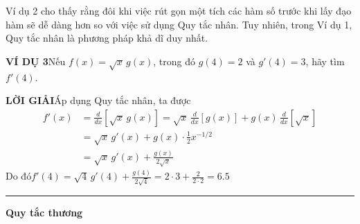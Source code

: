 \noindent
\begin{minipage}[t]{0.24\textwidth}
    \mbox{}
\end{minipage}%
\hfill
\begin{minipage}[t]{0.73\textwidth}
    \fontsize{10}{14}\selectfont
    Ví dụ 2 cho thấy rằng đôi khi việc rút gọn một tích các hàm số trước khi lấy đạo hàm sẽ dễ dàng hơn so với việc sử dụng Quy tắc nhân. Tuy nhiên, trong Ví dụ 1, Quy tắc nhân là phương pháp khả dĩ duy nhất.

    \vspace{8pt}
    \noindent\textbf{\textsf{\color{stewartcyan}VÍ DỤ 3}}\hspace{0.8em}Nếu $f(x) = \sqrt{x}\,g(x)$, trong đó $g(4) = 2$ và $g'(4) = 3$, hãy tìm $f'(4)$.

    \vspace{6pt}
    \noindent\textbf{\textsf{\color{stewartcyan}LỜI GIẢI}}\hspace{0.8em}Áp dụng Quy tắc nhân, ta được
    \begin{align*}
    f'(x) &= \frac{d}{dx}\left[\sqrt{x}\,g(x)\right] = \sqrt{x}\,\frac{d}{dx}[g(x)] + g(x)\,\frac{d}{dx}[\sqrt{x}] \\[4pt]
    &= \sqrt{x}\,g'(x) + g(x)\cdot \tfrac{1}{2}x^{-1/2} \\[4pt]
    &= \sqrt{x}\,g'(x) + \frac{g(x)}{2\sqrt{x}}
    \end{align*}
    \vspace{-4pt}
    \noindent Do đó\hspace{2em}$\displaystyle f'(4) = \sqrt{4}\,g'(4) + \frac{g(4)}{2\sqrt{4}} = 2\cdot 3 + \frac{2}{2\cdot 2} = 6.5$\hfill{\color{stewartcyan}\rule{1.15ex}{1.15ex}}

    \vspace{10pt}
    \noindent{\color{stewartcyan}\rule{1.15ex}{1.15ex}}\hspace{0.5em}\textbf{\large Quy tắc thương}


\end{minipage}
